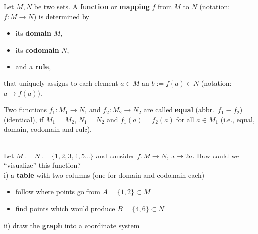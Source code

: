 \begin{frame}
\begin{defi}\label{def:function}
	Let $M, N$ be two sets. A \textbf{function} or \textbf{mapping} $f$ from $M$ to $N$ (notation: $f\colon M\to N$) is determined by
	\begin{itemize}
		\item[] its \textbf{domain} $M$, 
		\item[] its \textbf{codomain} $N$,
		\item[] and a \textbf{rule},
	\end{itemize} 
that uniquely assigns to each element $a\in M$ an $b:=f(a)\in N$ (notation: $a \mapsto f(a)$).	 
\end{defi}
Two functions $f_1: M_1\to N_1$ and $f_2: M_2\to N_2$ are called \textbf{equal} (abbr.~$f_1\equiv f_2$) (identical),
if $M_1=M_2$, $N_1=N_2$ and $f_1(a)=f_2(a)$ for all $a\in M_1$ (i.e., equal, domain, codomain and rule).
%
	
\vspace{0.4cm}
\begin{ex}\label{ex:image_preimage_graph}
	~\\
	\blank
	Let $M := N :=\{1,2,3,4,5\ldots\}$ and consider $f\colon M \to N,~ a \mapsto 2a$. How could we ``visualize'' this function?\\ \vspace{0.2cm}
	i) a \textbf{table} with two columns (one for domain and codomain each)
	\begin{itemize}
		\blank
		\item[] follow where points go from $A=\{1,2\}\subset M$ 
		\item[] find points which would produce $B=\{4,6\} \subset N$
	\end{itemize}\vspace{0.2cm}
	ii) draw the \textbf{graph} into a coordinate system
\end{ex}
\end{frame}

